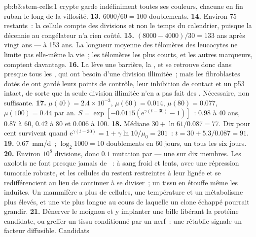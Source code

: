 \begin{solution}{pb:b3:stem-cells:1}
crypte garde indéfiniment toutes ses couleurs, chacune en fin ruban le
long de la villosité.
\textbf{13.} $6000/60 = 100$ doublements.
\textbf{14.} Environ $75$ restants~: la cellule compte des divisions et
non le temps du calendrier, puisque la décennie au congélateur n'a rien
coûté.
\textbf{15.} $(8000 - 4000)/30 = 133$ ans après vingt ans --- à 153 ans.
La longueur moyenne des télomères des leucocytes ne limite pas
elle-même la vie~; les télomères les plus courts, et les autres
marqueurs, comptent davantage.
\textbf{16.} La  lève une barrière, la , et se retrouve donc dans presque tous les , qui ont
besoin d'une division illimitée~; mais les fibroblastes dotés de
 ont gardé leurs points de contrôle, leur inhibition de
contact et un p53 intact, de sorte que la seule division illimitée n'en
a pas fait des . Nécessaire, non suffisante.
\textbf{17.} $\mu(40) = 2.4\times 10^{-3}$, $\mu(60) = 0.014$, $\mu(80) =
0.077$, $\mu(100) = 0.44$ par an. $S = \exp[-0.0115(\mathrm{e}^{\gamma
(t-30)} - 1)]$~: $0.98$ à 40 ans, $0.87$ à 60, $0.42$ à 80 et $0.006$ à
100.
\textbf{18.} Médiane $30 + \ln 61/0.087 = 77$. Dix pour cent survivent
quand $\mathrm{e}^{\gamma(t-30)} = 1 + \gamma\ln 10/\mu_{0} = 201$~: $t = 30 +
5.3/0.087 = 91$.
\textbf{19.} \qty{0.67}{mm/d}~; $\log_{2}1000 = 10$ doublements en 60
jours, un tous les six jours.
\textbf{20.} Environ $10^{8}$ divisions, donc $0.1$ mutation  par
 --- une sur dix membres. Les axolotls ne font presque jamais
de ~: à sang froid et lents, avec une répression tumorale
robuste, et les cellules du  restent restreintes à leur lignée
et se redifférencient au lieu de continuer à se diviser~; un tissu en
 étouffe même les  induites. Un mammifère a plus de
cellules, une température et un métabolisme plus élevés, et une vie plus
longue au cours de laquelle un clone échappé pourrait grandir.
\textbf{21.} Dénerver le moignon et y implanter une bille libérant la
protéine candidate, ou greffer un tissu conditionné par un nerf~: une
 rétablie signale un facteur diffusible. Candidats

\end{solution}
